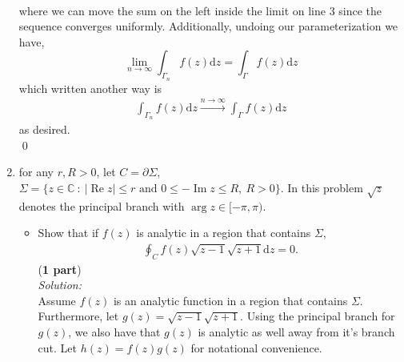 \documentclass[10pt]{amsart}
\newcommand{\D}{\mathrm{d}}
\DeclareMathOperator{\real}{Re}
\DeclareMathOperator{\imag}{Im}
\theoremstyle{nonumberplain}
\begin{document}
\begin{enumerate}[label={\bf {\arabic*}:}]
\begin{align*}
\end{align*}
where we can move the sum on the left inside the limit on line 3 since the sequence converges uniformly.
Additionally, undoing our parameterization we have,
$$\lim_{n\rightarrow\infty} \int_{\Gamma_n}  f(z) \D z = \int_\Gamma  f(z) \D z$$
which written another way is
\begin{align*}
	\int_{\Gamma_n} f(z) \D z \overset{n \to \infty}{\longrightarrow}   \int_{\Gamma} f(z) \D z
\end{align*}
as desired. \\
\qed \\
\newpage

\item for any $r, R > 0$, let $C = \partial \Sigma$, $\Sigma = \{z \in \mathbb C ~:~
      |\real z | \leq r \text{ and } 0 \leq -\imag z \leq R, ~ R >
    0\}$.   In this problem $\sqrt{z}$ denotes the principal branch
    with $\arg z  \in [-\pi, \pi)$.
    \begin{itemize}
    \item Show that if $f(z)$ is analytic in a region that contains $\Sigma$,
      \begin{align*}
        \oint_C f(z) \sqrt{z-1} \sqrt{z+1} \D z = 0.
      \end{align*}
(\textbf{1 part}) \\
\textit{Solution:} \\
Assume $f(z)$ is an analytic function in a region that contains $\Sigma$.
Furthermore, let $g(z) = \sqrt{z-1} \sqrt{z+1}$.
Using the principal branch for $g(z)$, we also have that $g(z)$ is analytic as well away from it's branch cut.
Let $h(z) = f(z)g(z)$ for notational convenience.\\


\end{itemize}
\end{enumerate}
\end{document}
